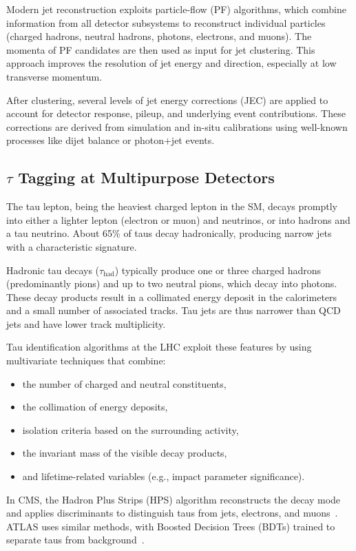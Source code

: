 Modern jet reconstruction exploits particle-flow (PF) algorithms, which combine information from all detector subsystems to reconstruct individual particles (charged hadrons, neutral hadrons, photons, electrons, and muons). The momenta of PF candidates are then used as input for jet clustering. This approach improves the resolution of jet energy and direction, especially at low transverse momentum.

After clustering, several levels of jet energy corrections (JEC) are applied to account for detector response, pileup, and underlying event contributions. These corrections are derived from simulation and in-situ calibrations using well-known processes like dijet balance or photon+jet events.

\subsection{$\tau$ Tagging at Multipurpose Detectors}

The tau lepton, being the heaviest charged lepton in the SM, decays promptly into either a lighter lepton (electron or muon) and neutrinos, or into hadrons and a tau neutrino. About 65\% of taus decay hadronically, producing narrow jets with a characteristic signature.

Hadronic tau decays ($\tau_{\text{had}}$) typically produce one or three charged hadrons (predominantly pions) and up to two neutral pions, which decay into photons. These decay products result in a collimated energy deposit in the calorimeters and a small number of associated tracks. Tau jets are thus narrower than QCD jets and have lower track multiplicity.

Tau identification algorithms at the LHC exploit these features by using multivariate techniques that combine:
\begin{itemize}
    \item the number of charged and neutral constituents,
    \item the collimation of energy deposits,
    \item isolation criteria based on the surrounding activity,
    \item the invariant mass of the visible decay products,
    \item and lifetime-related variables (e.g., impact parameter significance).
\end{itemize}

In CMS, the Hadron Plus Strips (HPS) algorithm reconstructs the decay mode and applies discriminants to distinguish taus from jets, electrons, and muons~\parencite{CMS:2022ydz}. ATLAS uses similar methods, with Boosted Decision Trees (BDTs) trained to separate taus from background~\parencite{ATLAS:2022fgo}.


